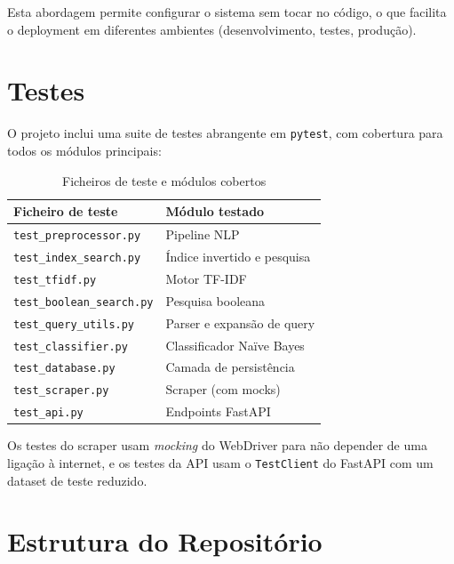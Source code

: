 \documentclass[12pt,a4paper]{article}
\begin{document}
Esta abordagem permite configurar o sistema sem tocar no código, o que facilita o deployment em diferentes ambientes (desenvolvimento, testes, produção).

\section{Testes}

O projeto inclui uma suite de testes abrangente em \texttt{pytest}, com cobertura para todos os módulos principais:

\begin{table}[H]
\centering
\caption{Ficheiros de teste e módulos cobertos}
\begin{tabular}{@{}ll@{}}
\toprule
\textbf{Ficheiro de teste}       & \textbf{Módulo testado} \\
\midrule
\texttt{test\_preprocessor.py}   & Pipeline NLP \\
\texttt{test\_index\_search.py}  & Índice invertido e pesquisa \\
\texttt{test\_tfidf.py}          & Motor TF-IDF \\
\texttt{test\_boolean\_search.py} & Pesquisa booleana \\  %
\texttt{test\_query\_utils.py}   & Parser e expansão de query \\
\texttt{test\_classifier.py}     & Classificador Naïve Bayes \\
\texttt{test\_database.py}       & Camada de persistência \\
\texttt{test\_scraper.py}        & Scraper (com mocks) \\
\texttt{test\_api.py}            & Endpoints FastAPI \\
\bottomrule
\end{tabular}
\end{table}

Os testes do scraper usam \emph{mocking} do WebDriver para não depender de uma ligação à internet, e os testes da API usam o \texttt{TestClient} do FastAPI com um dataset de teste reduzido.

\section{Estrutura do Repositório}
\end{document}
